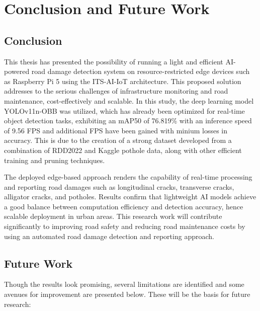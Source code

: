\chapter{Conclusion and Future Work}
\section{Conclusion} 

This thesis has presented the possibility of running a light and efficient AI-powered road damage detection system on resource-restricted edge devices such as Raspberry Pi 5 using the ITS-AI-IoT architecture. This proposed solution addresses to the serious challenges of infrastructure monitoring and road maintenance, cost-effectively and scalable. In this study, the deep learning model YOLOv11n-OBB was utilized, which has already been optimized for real-time object detection tasks, exhibiting an mAP50 of 76.819\% with an inference speed of 9.56 FPS and additional FPS have been gained with minium losses in accuracy. This is due to the creation of a strong dataset developed from a combination of RDD2022 and Kaggle pothole data, along with other efficient training and pruning techniques.

The deployed edge-based approach renders the capability of real-time processing and reporting road damages such as longitudinal cracks, transverse cracks, alligator cracks, and potholes. Results confirm that lightweight AI models achieve a good balance between computation efficiency and detection accuracy, hence scalable deployment in urban areas. This research work will contribute significantly to improving road safety and reducing road maintenance costs by using an automated road damage detection and reporting approach.

\section{Future Work} 

Though the results look promising, several limitations are identified and some avenues for improvement are presented below. These will be the basis for future research:

